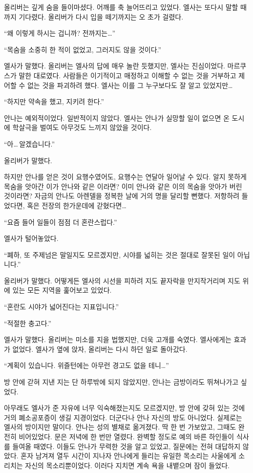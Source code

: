 올리버는 깊게 숨을 들이마셨다. 어깨를 축 늘어뜨리고 있었다. 엘사는 또다시 말할 때까지 기다렸다. 올리버가 다시 입을 떼기까지는 오 초가 걸렸다.

``왜 이렇게 하시는 겁니까? 전까지는\ldots''

``목숨을 소중히 한 적이 없었고, 그러지도 않을 것이다.''

엘사가 말했다. 올리버는 엘사의 답에 매우 놀란 듯했지만, 엘사는 진심이었다. 마르쿠스가 말한 대로였다. 사람들은 이기적이고 매정하고 이해할 수 없는 것을 거부하고 제어할 수 없는 것을 파괴하려 했다. 엘사는 이를 그 누구보다도 잘 알고 있었지만\ldots

``하지만 약속을 했고, 지키려 한다.''

안나는 예외적이었다. 일반적이지 않았다. 엘사는 안나가 실망할 일이 없으면 온 도시에 학살극을 벌여도 아무것도 느끼지 않았을 것이다.

``아\ldots\,알겠습니다.''

올리버가 말했다.

하지만 안나를 얻은 것이 요행수였어도, 요행수는 연달아 일어날 수 있다. 알지 못하게 목숨을 앗아간 이가 안나와 같은 이라면? 이미 안나와 같은 이의 목숨을 앗아가 버린 것이라면? 자금의 안나도 아렌델을 정복한 날에 거의 명을 달리할 뻔했다. 저항하려 들었다면, 혹은 전장의 한가운데에 갇혔다면\ldots

``요즘 들어 일들이 점점 더 혼란스럽다.''

엘사가 털어놓았다.

``폐하, 또 주제넘은 말일지도 모르겠지만, 시야를 넓히는 것은 절대로 잘못된 일이 아닙니다.''

올리버가 말했다. 어떻게든 엘사의 시선을 피하려 지도 끝자락을 만지작거리며 지도 위에 있는 모든 지역을 훑어보고 있었다.

``혼란도 시야가 넓어진다는 지표입니다.''

``적절한 충고다.''

엘사가 말했다. 올리버는 미소를 지을 법했지만, 더욱 고개를 숙였다. 엘사에게는 효과가 없었다. 엘사가 옆에 앉자, 올리버는 다시 하던 일로 돌아갔다.

``계획이 있습니다. 위즐턴에는 아무런 경고도 없을 테니\ldots''

\textbreak

방 안에 갇혀 지낸 지는 단 하루밖에 되지 않았지만, 안나는 금방이라도 뛰쳐나가고 싶었다.

아무래도 엘사가 준 자유에 너무 익숙해졌는지도 모르겠지만, 방 안에 갖혀 있는 것에 거의 폐소공포증이 생길 지경이었다. 더군다나 안나 자신의 방도 아니었다. 실제로는 엘사의 방이지만 말이다. 안나는 성의 별채로 옮겨졌다. 딱 한 번 가보았고, 그때도 완전히 비어있었다. 문은 저녁에 한 번만 열렸다. 완벽할 정도로 예의 바른 하인들이 식사를 들여올 때였다. 이들도 안나가 무력한 것을 알고 있었고, 질문에는 전혀 대답하지 않았다. 혼자 남겨져 열두 시간이 지나자 안나에게 들리는 유일한 목소리는 사울에게 소리치는 자신의 목소리뿐이었다. 이러다 지치면 계속 욕을 내뱉으며 잠이 들었다.

